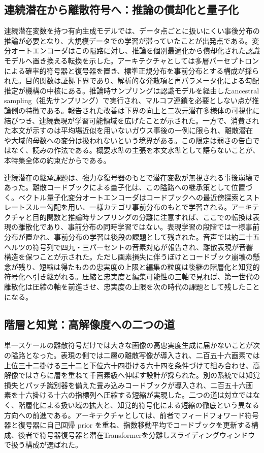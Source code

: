 \documentclass[lualatex,a4paper,10pt]{jlreq}
\begin{document}
\subsection{連続潜在から離散符号へ：推論の償却化と量子化}
連続潜在変数を持つ有向生成モデルでは、データ点ごとに扱いにくい事後分布の推論が必要となり、大規模データでの学習が滞っていたことが出発点である。変分オートエンコーダはこの隘路に対し、推論を個別最適化から償却化された認識モデルへ置き換える転換を示した\autocite{btd001}。アーキテクチャとしては多層パーセプトロンによる確率的符号器と復号器を置き、標準正規分布を事前分布とする構成が採られた。目的関数は証拠下界であり、解析的な発散項と再パラメータ化による勾配推定が機構の中核にある。推論時サンプリングは認識モデルを経由したancestral sampling（祖先サンプリング）で実行され、マルコフ連鎖を必要としない点が推論側の特徴である\autocite{btd001}。報告された改善は下界の向上と二次元潜在多様体の可視化に結びつき、連続表現が学習可能領域を広げたことが示された。一方で、消費された本文が示すのは平均場近似を用いないガウス事後の一例に限られ、離散潜在や大域的母数への変分は扱われないという境界がある。この限定は弱さの告白ではなく、読みの作法である。概要水準の主張を本文水準として語らないことが、本特集全体の約束だからである。

連続潜在の継承課題は、強力な復号器のもとで潜在変数が無視される事後崩壊であった。離散コードブックによる量子化は、この隘路への継承策として位置づく。ベクトル量子化変分オートエンコーダはコードブックへの最近傍探索とストレートスルー勾配を用い、一様カテゴリ事前分布のもとで学習される\autocite{btd002}。アーキテクチャと目的関数と推論時サンプリングの分離に注意すれば、ここでの転換は表現の離散化であり、事前分布の同時学習ではない。表現学習の段階では一様事前分布が置かれ、事前分布の学習は後段の課題として残された。音声では約二十五ヘルツの符号列で四九・三パーセントの音素対応が報告され、離散表現が音響構造を保つことが示された\autocite{btd002}。ただし画素損失に伴うぼけとコードブック崩壊の懸念が残り、短縮は得たものの忠実度の上限と編集の粒度は後継の階層化と知覚的符号化へ引き継がれる。圧縮と忠実度と編集可能性の三軸で見れば、第一世代の離散化は圧縮の軸を前進させ、忠実度の上限を次の時代の課題として残したことになる。

\subsection{階層と知覚：高解像度への二つの道}
単一スケールの離散符号だけでは大きな画像の高忠実度生成に届かないことが次の隘路となった。表現の側では二層の離散写像が導入され、二百五十六画素では上位三十二掛ける三十二と下位六十四掛ける六十四を条件づけて組み合わせ、高解像ではさらに層を重ねて千画素級へ伸ばす設計が採られた\autocite{btd003}。別の系統では知覚損失とパッチ識別器を備えた畳み込みコードブックが導入され、二百五十六画素を十六掛ける十六の指標列へ圧縮する短縮が実現した\autocite{btd004}。二つの道は対立ではなく、階層化による扱い域の拡大と、知覚的符号化による短縮の徹底という異なる方向への前進である。アーキテクチャとしては、前者でフィードフォワード符号器と復号器に自己回帰 prior を重ね、指数移動平均でコードブックを更新する構成、後者で符号器復号器と潜在Transformerを分離しスライディングウィンドウで扱う構成が選ばれた\autocite{btd003,btd004}。
\end{document}

